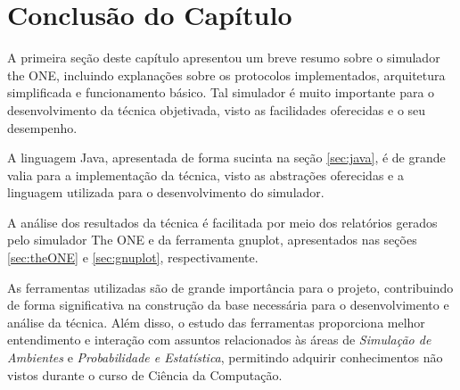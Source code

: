 \section{Conclusão do Capítulo}\label{sec:conclusao_cap_3}

A primeira seção deste capítulo apresentou um breve resumo sobre o simulador the ONE, incluindo explanações sobre os protocolos implementados, arquitetura simplificada e funcionamento básico. Tal simulador é muito importante para o desenvolvimento da técnica objetivada, visto as facilidades oferecidas e o seu desempenho.

A linguagem Java, apresentada de forma sucinta na seção \ref{sec:java}, é de grande valia para a implementação da técnica, visto as abstrações oferecidas e a linguagem utilizada para o desenvolvimento do simulador.

A análise dos resultados da técnica é facilitada por meio dos relatórios gerados pelo simulador The ONE e da ferramenta gnuplot, apresentados nas seções \ref{sec:theONE} e \ref{sec:gnuplot}, respectivamente.

As ferramentas utilizadas são de grande importância para o projeto, contribuindo de forma significativa na construção da base necessária para o desenvolvimento e análise da técnica. Além disso, o estudo das ferramentas proporciona melhor entendimento e interação com assuntos relacionados às áreas de \emph{Simulação de Ambientes} e \emph{Probabilidade e Estatística}, permitindo adquirir conhecimentos não vistos durante o curso de Ciência da Computação.